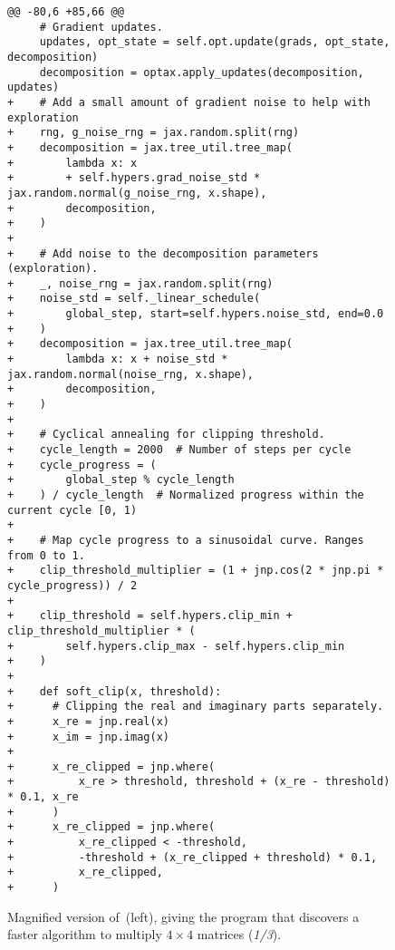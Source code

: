 \begin{figure}[p]
\begin{adjustbox}{width=0.9\textwidth}
\begin{minipage}{0.9\textwidth}
\begin{lstlisting}[style=pydiff, backgroundcolor=\color{backcolour}]
@@ -80,6 +85,66 @@
     # Gradient updates.
     updates, opt_state = self.opt.update(grads, opt_state, decomposition)
     decomposition = optax.apply_updates(decomposition, updates)
+    # Add a small amount of gradient noise to help with exploration
+    rng, g_noise_rng = jax.random.split(rng)
+    decomposition = jax.tree_util.tree_map(
+        lambda x: x
+        + self.hypers.grad_noise_std * jax.random.normal(g_noise_rng, x.shape),
+        decomposition,
+    )
+
+    # Add noise to the decomposition parameters (exploration).
+    _, noise_rng = jax.random.split(rng)
+    noise_std = self._linear_schedule(
+        global_step, start=self.hypers.noise_std, end=0.0
+    )
+    decomposition = jax.tree_util.tree_map(
+        lambda x: x + noise_std * jax.random.normal(noise_rng, x.shape),
+        decomposition,
+    )
+
+    # Cyclical annealing for clipping threshold.
+    cycle_length = 2000  # Number of steps per cycle
+    cycle_progress = (
+        global_step % cycle_length
+    ) / cycle_length  # Normalized progress within the current cycle [0, 1)
+
+    # Map cycle progress to a sinusoidal curve. Ranges from 0 to 1.
+    clip_threshold_multiplier = (1 + jnp.cos(2 * jnp.pi * cycle_progress)) / 2
+
+    clip_threshold = self.hypers.clip_min + clip_threshold_multiplier * (
+        self.hypers.clip_max - self.hypers.clip_min
+    )
+
+    def soft_clip(x, threshold):
+      # Clipping the real and imaginary parts separately.
+      x_re = jnp.real(x)
+      x_im = jnp.imag(x)
+
+      x_re_clipped = jnp.where(
+          x_re > threshold, threshold + (x_re - threshold) * 0.1, x_re
+      )
+      x_re_clipped = jnp.where(
+          x_re_clipped < -threshold,
+          -threshold + (x_re_clipped + threshold) * 0.1,
+          x_re_clipped,
+      )
\end{lstlisting}
\end{minipage}
\end{adjustbox}
\caption{
Magnified version of~(left), giving the program that discovers a faster algorithm to multiply $4\times4$ matrices (\emph{1/3}).}\label{fig:relaxed-opt-diff-appendix-1}
\centering
\end{figure}
\addtocounter{figure}{-1}


